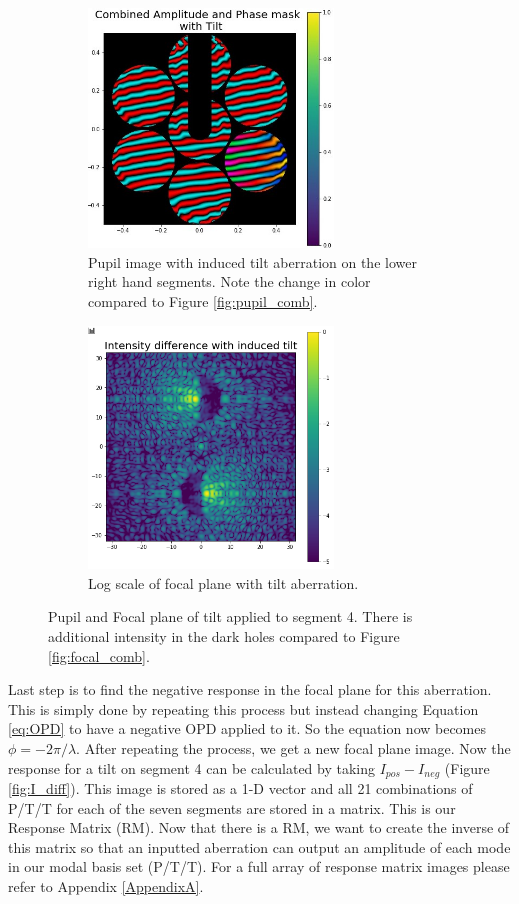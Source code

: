 \begin{figure}[H]
\centering
\begin{subfigure}{.5\textwidth}
  \centering
  \includegraphics[width=6.5cm]{Figures/tilt_comb.jpg}
  \caption{Pupil image with induced tilt aberration on the lower right hand segments.  Note the change in color compared to Figure \ref{fig:pupil_comb}.}
  \label{fig:tilt_pupil}
\end{subfigure}%
\begin{subfigure}{.5\textwidth}
  \centering
  \includegraphics[width=6.5cm]{Figures/PSF_tilt.png}
  \caption{Log scale of focal plane with tilt aberration.}
  \label{fig:tilt_focal}
\end{subfigure}
\caption{Pupil and Focal plane of tilt applied to segment 4.  There is additional intensity in the dark holes compared to Figure \ref{fig:focal_comb}.}
\label{fig:abb_images}
\end{figure}

Last step is to find the negative response in the focal plane for this aberration.  This is simply done by repeating this
process but instead changing Equation \ref{eq:OPD} to have a negative OPD applied to it.  So the equation now
becomes $\phi = -2 \pi / \lambda$.  After repeating the process, we get a new focal plane image.  Now the response
for a tilt on segment 4 can be calculated by taking $I_{pos} - I_{neg}$ (Figure \ref{fig:I_diff}).  This image is
stored as a 1-D vector and all 21 combinations of P/T/T for each of the seven segments are stored in a matrix.  This
is our Response Matrix (RM).  Now that there is a RM, we want to create the inverse of this matrix so that an inputted
aberration can output an amplitude of each mode in our modal basis set (P/T/T).  For a full array of response matrix images please refer to Appendix \ref{AppendixA}.


